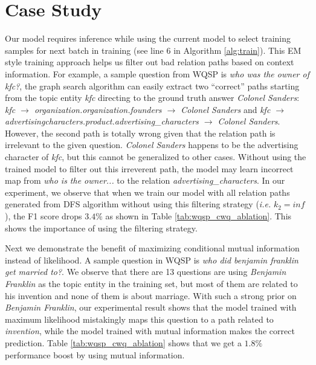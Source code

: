 \section{Case Study}\label{sec:case}


Our model requires inference while using the current model to select training samples for next batch in training (see line 6 in Algorithm \ref{alg:train}). This EM style training approach helps us filter out bad relation paths based on context information. For example, a sample question from WQSP is \textit{who was the owner of kfc?}, the graph search algorithm can easily extract two ``correct'' paths starting from the topic entity \textit{kfc} directing to the ground truth answer \textit{Colonel Sanders}: \textit{kfc $\rightarrow$ organization.organization.founders $\rightarrow$ Colonel Sanders} and \textit{kfc $\rightarrow$ advertisingcharacters.product.advertising\_characters $\rightarrow$ Colonel Sanders}. However, the second path is totally wrong given that the relation path is irrelevant to the given question. \textit{Colonel Sanders} happens to be the advertising character of \textit{kfc}, but this cannot be generalized to other cases. Without using the trained model to filter out this irreverent path, the model may learn incorrect map from \textit{who is the owner...} to the relation \textit{advertising\_characters}. In our experiment, we observe that when we train our model with all relation paths generated from DFS algorithm without using this filtering strategy (\emph{i.e.} $k_2=inf$), the F1 score drops $3.4\%$ as shown in Table \ref{tab:wqsp_cwq_ablation}. This shows the importance of using the filtering strategy.

Next we demonstrate the benefit of maximizing conditional mutual information instead of likelihood. A sample question in WQSP is \textit{who did benjamin franklin get married to?}. We observe that there are 13 questions are using \textit{Benjamin Franklin} as the topic entity in the training set, but most of them are related to his invention and none of them is about marriage. With such a strong prior on \textit{Benjamin Franklin}, our experimental result shows that the model trained with maximum likelihood mistakingly maps this question to a path related to \textit{invention}, while the model trained with mutual information makes the correct prediction. Table \ref{tab:wqsp_cwq_ablation} shows that we get a $1.8\%$ performance boost by using mutual information.




